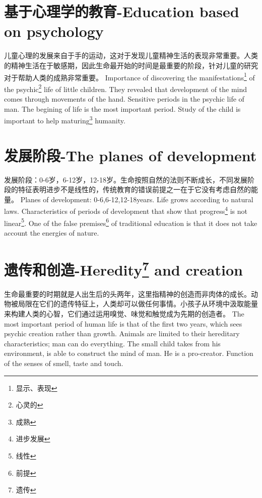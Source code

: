 \documentclass[lang=cn,10pt]{elegantbook}
\begin{document}
\chapter{基于心理学的教育-Education based on psychology}

\begin{tcolorbox}[title=摘要,
colback=red!5!white,
colframe=red!75!black,
fonttitle=\bfseries]
儿童心理的发展来自于手的运动，这对于发现儿童精神生活的表现非常重要。人类的精神生活在于敏感期，因此生命最开始的时间是最重要的阶段，针对儿童的研究对于帮助人类的成熟非常重要。
Importance of discovering the manifestations\footnote{显示、表现} of the psychic\footnote{心灵的} life of little children. They revealed that development of the mind comes through movements of the hand. Sensitive periods in the psychic life of man. The begining of life is the most important period. Study of the child is important to help maturing\footnote{成熟} humanity.
\end{tcolorbox}

\chapter{发展阶段-The planes of development}

\begin{tcolorbox}[title=摘要,
colback=red!5!white,
colframe=red!75!black,
fonttitle=\bfseries]
发展阶段：0-6岁，6-12岁，12-18岁。生命按照自然的法则不断成长，不同发展阶段的特征表明进步不是线性的，传统教育的错误前提之一在于它没有考虑自然的能量。
Planes of development: 0-6,6-12,12-18years. Life grows according to natural laws. Characteristics of periods of development that show that progress\footnote{进步发展} is not linear\footnote{线性}. One of the false premises\footnote{前提} of traditional education is that it does not take account the energies of nature.
\end{tcolorbox}

\chapter{遗传和创造-Heredity\footnote{遗传} and creation}

\begin{tcolorbox}[title=摘要,
colback=red!5!white,
colframe=red!75!black,
fonttitle=\bfseries]
生命最重要的时期就是人出生后的头两年，这里指精神的创造而非肉体的成长。动物被局限在它们的遗传特征上，人类却可以做任何事情。小孩子从环境中汲取能量来构建人类的心智，它们通过运用嗅觉、味觉和触觉成为先期的创造者。
The most important period of human life is that of the first two years, which sees psychic creation rather than growth. Animals are limited to their hereditary characteristics; man can do everything. The small child takes from his environment, is able to construct the mind of man. He is a pro-creator. Function of the senses of smell, taste and touch.
\end{tcolorbox}
\end{document}
